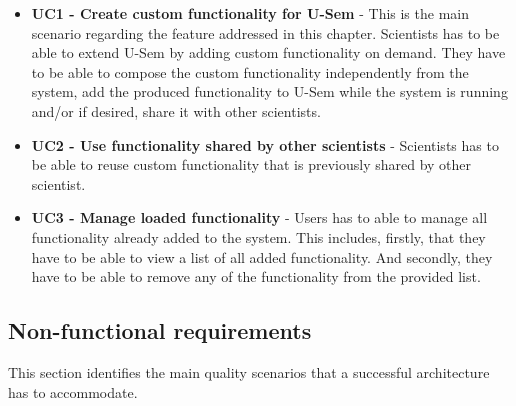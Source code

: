 \begin{itemize}

	\item \textbf{UC1 - Create custom functionality for U-Sem} - This is the main scenario regarding the feature addressed in this chapter. Scientists has to be able to extend U-Sem by adding custom functionality on demand. They have to be able to compose the custom functionality independently from the system, add the produced functionality to U-Sem while the system is running and/or if desired, share it with other scientists.
	
	\item \textbf{UC2 - Use functionality shared by other scientists} - Scientists has to be able to reuse custom functionality that is previously shared by other scientist.
	
	\item \textbf{UC3 - Manage loaded functionality} - Users has to able to manage all functionality already added to the system. This includes, firstly, that they have to be able to view a list of all added functionality. And secondly, they have to be able to remove any of the functionality from the provided list.
			
\end{itemize}

\subsection{Non-functional requirements}

This section identifies the main quality scenarios that a successful architecture has to accommodate. 

